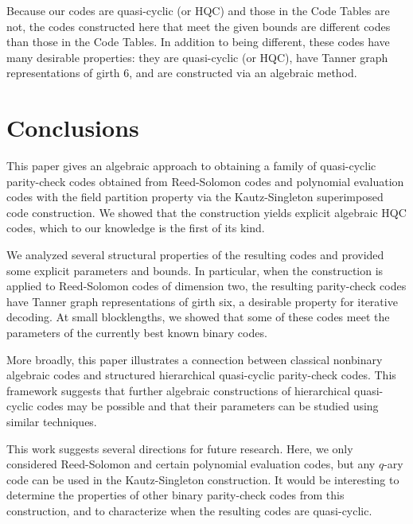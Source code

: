 \documentclass[11pt]{amsart}
\theoremstyle{definition}
\newcommand{\0}{\mathbf{0}}
\begin{document}
Because our codes are quasi-cyclic (or HQC) and those in the Code Tables are not, the codes constructed here that meet the given bounds are different codes than those in the Code Tables. In addition to being different, these codes have many desirable properties: they are quasi-cyclic (or HQC), have Tanner graph representations of girth $6$, and are constructed via an algebraic method.

\section{Conclusions}
\label{sec:conclusion}

This paper gives an algebraic approach to obtaining a family of quasi-cyclic parity-check codes obtained from Reed-Solomon codes and polynomial evaluation codes with the field partition property via the Kautz-Singleton superimposed code construction. We showed that the construction yields explicit algebraic HQC codes, which to our knowledge is the first of its kind.

We analyzed several structural properties of the resulting codes and provided some explicit parameters and bounds. In particular, when the construction is applied to Reed-Solomon codes of dimension two, the resulting parity-check codes have Tanner graph representations of girth six, a desirable property for iterative decoding. At small blocklengths, we showed that some of these codes meet the parameters of the currently best known binary codes.

More broadly, this paper illustrates a connection between classical nonbinary algebraic codes and structured hierarchical quasi-cyclic parity-check codes. This framework suggests that further algebraic constructions of hierarchical quasi-cyclic codes may be possible and that their parameters can be studied using similar techniques.

This work suggests several directions for future research. Here, we only considered Reed-Solomon and certain polynomial evaluation codes, but any $q$-ary code can be used in the Kautz-Singleton construction. It would be interesting to determine the properties of other binary parity-check codes from this construction, and to characterize when the resulting codes are quasi-cyclic.

\newpage
\appendix
\section{}
\end{document}
